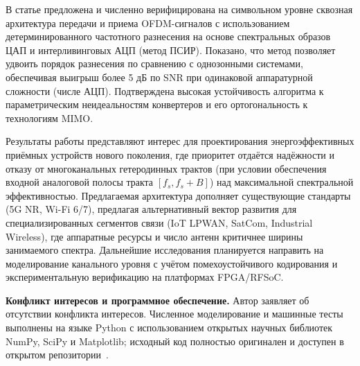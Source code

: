 \documentclass[a4paper,12pt]{article}
\numberwithin{equation}{section}
\begin{document}
В статье предложена и численно верифицирована на символьном уровне сквозная архитектура передачи и приема OFDM-сигналов с использованием детерминированного частотного разнесения на основе спектральных образов ЦАП и интерливинговых АЦП (метод ПСИР). Показано, что метод позволяет удвоить порядок разнесения по сравнению с однозонными системами, обеспечивая выигрыш более 5 дБ по SNR при одинаковой аппаратурной сложности (числе АЦП). Подтверждена высокая устойчивость алгоритма к параметрическим неидеальностям конвертеров и его ортогональность к технологиям MIMO.

Результаты работы представляют интерес для проектирования энергоэффективных приёмных устройств нового поколения, где приоритет отдаётся надёжности и отказу от многоканальных гетеродинных трактов (при условии обеспечения входной аналоговой полосы тракта $[f_s, f_s+B]$) над максимальной спектральной эффективностью. Предлагаемая архитектура дополняет существующие стандарты (5G NR, Wi-Fi 6/7), предлагая альтернативный вектор развития для специализированных сегментов связи (IoT LPWAN, SatCom, Industrial Wireless), где аппаратные ресурсы и число антенн критичнее ширины занимаемого спектра. Дальнейшие исследования планируется направить на моделирование канального уровня с учётом помехоустойчивого кодирования и экспериментальную верификацию на платформах FPGA/RFSoC.

\vspace{0.3cm}
\noindent\textbf{Конфликт интересов и программное обеспечение.} Автор заявляет об отсутствии конфликта интересов. Численное моделирование и машинные тесты выполнены на языке Python с использованием открытых научных библиотек NumPy, SciPy и Matplotlib; исходный код полностью оригинален и доступен в открытом репозитории~\cite{github}.
\end{document}
